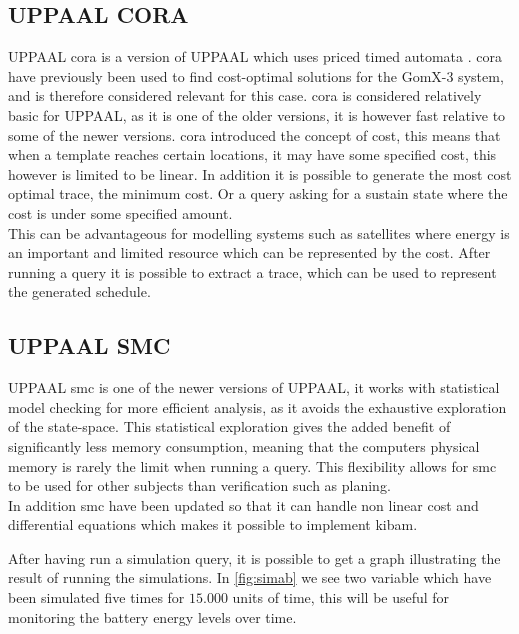 \subsection{UPPAAL CORA}
UPPAAL \gls{cora} is a version of UPPAAL which uses priced timed automata \cite{cs_cora}. \Gls{cora} have previously been used to find cost-optimal solutions for the GomX-3 system\cite{gomx3}, and is therefore considered relevant for this case.
\Gls{cora} is considered relatively basic for UPPAAL, as it is one of the older versions, it is however fast relative to some of the newer versions. \Gls{cora} introduced the concept of cost, this means that when a template reaches certain locations, it may have some specified cost, this however is limited to be linear. In addition it is possible to generate the most cost optimal trace, the minimum cost. Or a query asking for a sustain state where the cost is under some specified amount.\\
This can be advantageous for modelling systems such as satellites where energy is an important and limited resource which can be represented by the cost. After running a query it is possible to extract a trace, which can be used to represent the generated schedule.


\subsection{UPPAAL SMC}
UPPAAL \gls{smc} is one of the newer versions of UPPAAL, it works with statistical model checking for more efficient analysis, as it avoids the exhaustive exploration of the state-space. This statistical exploration gives the added benefit of significantly less memory consumption\cite{cs_smc}, meaning that the computers physical memory is rarely the limit when running a query. This flexibility allows for \gls{smc} to be used for other subjects than verification such as planing\cite{cs_smc}. \\
In addition \gls{smc} have been updated so that it can handle non linear cost and differential equations which makes it possible to implement \gls{kibam}.

After having run a simulation query, it is possible to get a graph illustrating the result of running the simulations. In \cref{fig:simab} we see two variable which have been simulated five times for $15.000$ units of time, this will be useful for monitoring the battery energy levels over time.

